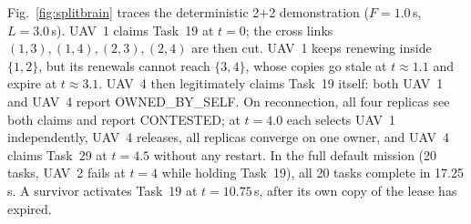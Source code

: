 \documentclass[conference]{IEEEtran}
\newcommand{\stt}[1]{\textsf{#1}}     %
\begin{document}
Fig.~\ref{fig:splitbrain} traces the deterministic 2+2 demonstration
($F=1.0$\,s, $L=3.0$\,s). UAV~1 claims Task~19 at $t=0$; the cross links
$(1,3),(1,4),(2,3),(2,4)$ are then cut. UAV~1 keeps renewing inside $\{1,2\}$,
but its renewals cannot reach $\{3,4\}$, whose copies go stale at $t\approx1.1$
and expire at $t\approx3.1$. UAV~4 then legitimately claims Task~19 itself:
both UAV~1 and UAV~4 report \stt{OWNED\_BY\_SELF}. On reconnection, all four
replicas see both claims and report \stt{CONTESTED}; at $t=4.0$ each selects
UAV~1 independently, UAV~4 releases, all replicas converge on one owner, and
UAV~4 claims Task~29 at $t=4.5$ without any restart. In the full default
mission (20 tasks, UAV~2 fails at $t=4$ while holding Task~19), all 20 tasks
complete in 17.25\,s. A survivor activates Task~19 at $t=10.75$\,s, after its
own copy of the lease has expired.
\end{document}
